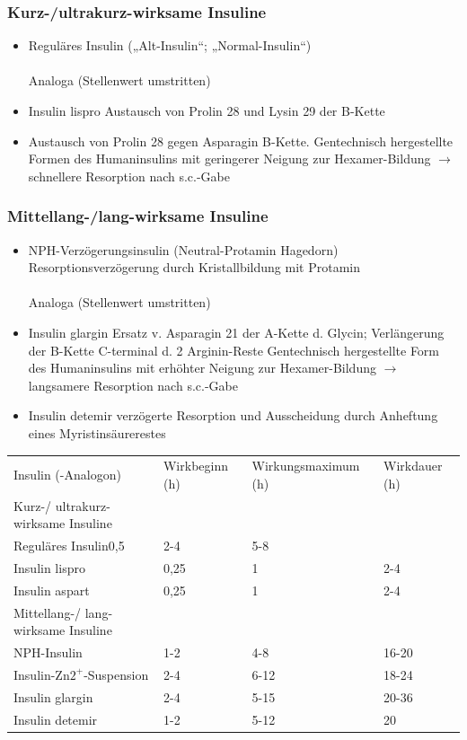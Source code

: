 \documentclass[10pt,a4paper]{report}
\begin{document}
\subsubsection{Kurz-/ultrakurz-wirksame Insuline} %
\label{ssub:kurz_ultrakurz_wirksame_insuline}
\begin{itemize}
	\item Reguläres Insulin („Alt-Insulin“; „Normal-Insulin“) \\ \\
	Analoga (Stellenwert umstritten)
	\item Insulin lispro Austausch von Prolin 28 und Lysin 29 der B-Kette
	\item Austausch von Prolin 28 gegen Asparagin B-Kette. Gentechnisch hergestellte Formen des Humaninsulins mit geringerer Neigung zur Hexamer-Bildung $\rightarrow$ schnellere Resorption nach s.c.-Gabe
\end{itemize}
\subsubsection{Mittellang-/lang-wirksame Insuline} %
\label{ssub:mittellang_lang_wirksame_insuline}
\begin{itemize}
	\item NPH-Verzögerungsinsulin (Neutral-Protamin Hagedorn) Resorptionsverzögerung durch Kristallbildung mit Protamin \\ \\
	Analoga (Stellenwert umstritten)
	\item Insulin glargin Ersatz v. Asparagin 21 der A-Kette d. Glycin; Verlängerung der B-Kette C-terminal d. 2 Arginin-Reste Gentechnisch hergestellte Form des Humaninsulins mit erhöhter Neigung zur Hexamer-Bildung $\rightarrow$ langsamere Resorption nach s.c.-Gabe
	\item Insulin detemir verzögerte Resorption und Ausscheidung durch Anheftung eines Myristinsäurerestes 
\end{itemize}
\begin{tabularx}{\textwidth}{XXXX}
Insulin (-Analogon)&Wirkbeginn (h)&Wirkungsmaximum (h)&Wirkdauer (h)\\
Kurz-/ ultrakurz-wirksame Insuline&&&\\
Reguläres Insulin0,5&2-4&5-8\\
Insulin lispro&0,25&1&2-4\\
Insulin aspart&0,25&1&2-4\\
Mittellang-/ lang-wirksame Insuline&&&\\
NPH-Insulin&1-2&4-8&16-20\\
Insulin-Zn$2^+$-Suspension&2-4&6-12&18-24\\
Insulin glargin&2-4&5-15&20-36\\
Insulin detemir&1-2&5-12&20\\
\end{tabularx}
\end{document}
